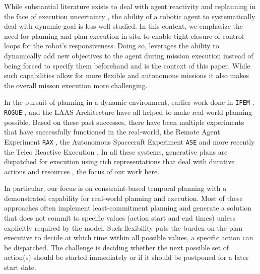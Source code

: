 While substantial literature exists to deal with agent reactivity and
replanning in the face of execution uncertainty , the ability of a robotic agent to systematically deal with
dynamic goal is less well studied. In this context, we emphasize the
need for planning and plan execution in-situ to enable tight closure
of control loops for the robot's responsiveness.
Doing so, leverages the ability to dynamically add new objectives to
the agent during mission execution instead of being forced to specify
them beforehand and is the context of this paper.  While such
capabilities allow for more flexible and autonomous missions it also
makes the overall misson execution more challenging.

In the pursuit of planning in a dynamic environment, earlier work done
in \texttt{IPEM} \cite{AmbrosIngerson88}, \texttt{ROGUE}
\cite{Haigh98}, and the LAAS Architecture \cite{alami:1998p820} have
all helped to make real-world planning possible. Based on these past
successes, there have been multiple experiments that have successfully
functioned in the real-world, the Remote Agent Experiment \texttt{RAX}
\cite{mus98}, the Autonomous Spacecraft Experiment \texttt{ASE}
\cite{chien99} and more recently the Teleo Reactive Execution \rxe
\cite{mcgann08b,py10}. In all these systems, generative plans are
dispatched for execution using rich representations that deal with
durative actions and resources \cite{lemai-chenevier2004}, the focus of our work
here.

In particular, our focus is on constraint-based temporal planning
\cite{frank2003,lemai04} with a demonstrated capability for real-world
planning and execution.
Most of these approaches often implement  least-commitment 
planning and generate a solution that does not commit to specific 
values (\eg action start and end
times) unless explicitly required by the model. Such flexibility puts
the burden on the plan executive to decide at which time within all
possible values, a specific action can be  dispatched. 
The challenge is deciding whether the next possible set of action(s)
should be started immediately or if it should be postponed for a later
start date.

